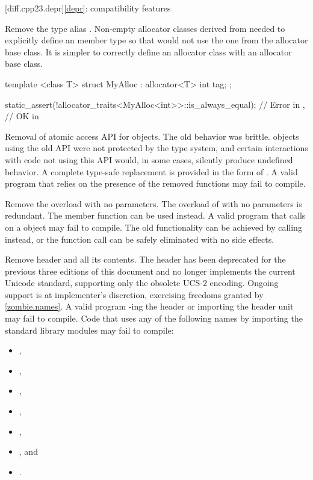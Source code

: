 [diff.cpp23.depr]{\ref{depr}: compatibility features}

\nodiffref
\change
Remove the type alias .
\rationale
Non-empty allocator classes derived from  needed to explicitly
define an  member type so that 
would not use the one from the allocator base class.
\effect
It is simpler to correctly define an allocator class with an allocator base
class.
\begin{example}
\begin{codeblock}
template <class T>
struct MyAlloc : allocator<T> {
  int tag;
};

static_assert(!allocator_traits<MyAlloc<int>>::is_always_equal);        // Error in \CppXXIII{},
                                                                        // OK in \CppXXVI{}
\end{codeblock}
\end{example}

\nodiffref
\change
Removal of atomic access API for  objects.
\rationale
The old behavior was brittle.  objects using the old API were
not protected by the type system, and certain interactions with code not using
this API would, in some cases, silently produce undefined behavior. A complete
type-safe replacement is provided in the form of .
\effect
A valid \CppXXIII{} program that relies on the presence of the removed functions
may fail to compile.

\nodiffref
\change
Remove the  overload with no parameters.
\rationale
The overload of  with no parameters is redundant.
The  member function can be used instead.
\effect
A valid \CppXXIII{} program that calls 
on a  object may fail to compile.
The old functionality can be achieved by calling  instead,
or the function call can be safely eliminated with no side effects.

\nodiffref
\change
Remove header  and all its contents.
\rationale
The header has been deprecated for the previous three editions of this document
and no longer implements the current Unicode standard, supporting only the
obsolete UCS-2 encoding.
Ongoing support is at implementer's discretion,
exercising freedoms granted by \ref{zombie.names}.
\effect
A valid \CppXXIII{} program -ing the header or importing the
header unit may fail to compile. Code that uses any of the following names by
importing the standard library modules may fail to compile:
\begin{itemize}
\item {},
\item {},
\item {},
\item {},
\item {},
\item {}, and
\item {}.
\end{itemize}

